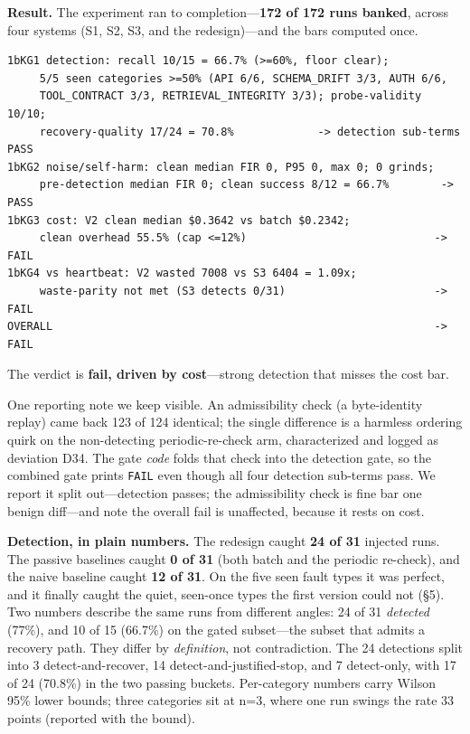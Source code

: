 \documentclass[acmsmall,screen]{acmart}
\begin{document}
\textbf{Result.} The experiment ran to completion---\textbf{172 of 172 runs
banked}, across four systems (S1, S2, S3, and the redesign)---and the bars
computed once.

\begin{lstlisting}
1bKG1 detection: recall 10/15 = 66.7% (>=60%, floor clear);
     5/5 seen categories >=50% (API 6/6, SCHEMA_DRIFT 3/3, AUTH 6/6,
     TOOL_CONTRACT 3/3, RETRIEVAL_INTEGRITY 3/3); probe-validity 10/10;
     recovery-quality 17/24 = 70.8%             -> detection sub-terms PASS
1bKG2 noise/self-harm: clean median FIR 0, P95 0, max 0; 0 grinds;
     pre-detection median FIR 0; clean success 8/12 = 66.7%        -> PASS
1bKG3 cost: V2 clean median $0.3642 vs batch $0.2342;
     clean overhead 55.5% (cap <=12%)                             -> FAIL
1bKG4 vs heartbeat: V2 wasted 7008 vs S3 6404 = 1.09x;
     waste-parity not met (S3 detects 0/31)                       -> FAIL
OVERALL                                                           -> FAIL
\end{lstlisting}

The verdict is \textbf{fail, driven by cost}---strong detection that misses the
cost bar.

One reporting note we keep visible. An admissibility check (a byte-identity
replay) came back 123 of 124 identical; the single difference is a harmless
ordering quirk on the non-detecting periodic-re-check arm, characterized and
logged as deviation D34. The gate \emph{code} folds that check into the
detection gate, so the combined gate prints \texttt{FAIL} even though all four
detection sub-terms pass. We report it split out---detection passes; the
admissibility check is fine bar one benign diff---and note the overall fail is
unaffected, because it rests on cost.

\textbf{Detection, in plain numbers.} The redesign caught \textbf{24 of 31}
injected runs. The passive baselines caught \textbf{0 of 31} (both batch and the
periodic re-check), and the naive baseline caught \textbf{12 of 31}. On the five
seen fault types it was perfect, and it finally caught the quiet, seen-once
types the first version could not (\S5). Two numbers describe the same runs from
different angles: 24 of 31 \emph{detected} (77\%), and 10 of 15 (66.7\%) on the
gated subset---the subset that admits a recovery path. They differ by
\emph{definition}, not contradiction. The 24 detections split into 3
detect-and-recover, 14 detect-and-justified-stop, and 7 detect-only, with 17 of
24 (70.8\%) in the two passing buckets. Per-category numbers carry Wilson 95\%
lower bounds; three categories sit at n=3, where one run swings the rate 33
points (reported with the bound).
\end{document}
